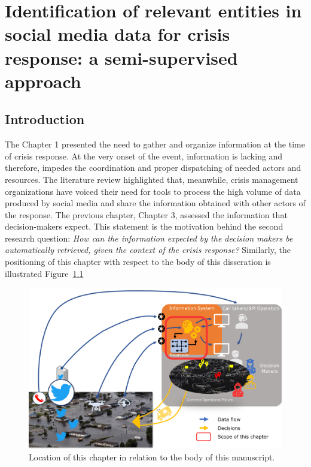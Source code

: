 \chapter{Identification of relevant entities in social media data for crisis response: a semi-supervised approach}

\section*{Introduction}
The Chapter 1 presented the need to gather and organize information at the time of crisis
response.
At the very onset of the event, information is lacking and therefore,
impedes the coordination and proper dispatching of needed actors and resources.
The literature review highlighted that, meanwhile, crisis management organizations have
voiced their need for tools to process the high volume of data produced by social media
and share the information obtained with other actors of the response.
The previous chapter, Chapter 3, assessed the information that decision-makers expect.
This statement is the motivation behind the second research question: \textit{How can the
    information expected by the decision makers be automatically retrieved, given the context
    of the crisis response?}
Similarly, the positioning of this chapter with respect to the body of this disseration
is illustrated Figure~\ref{processing:big-picture-manuscrit}

\begin{figure}[htb]
    \centering
    \includegraphics[width=\textwidth]{figures/chap-4/position-chapter.pdf}
    \caption{Location of this chapter in relation to the body of this manuscript.}
    \label{processing:big-picture-manuscrit}
\end{figure}

